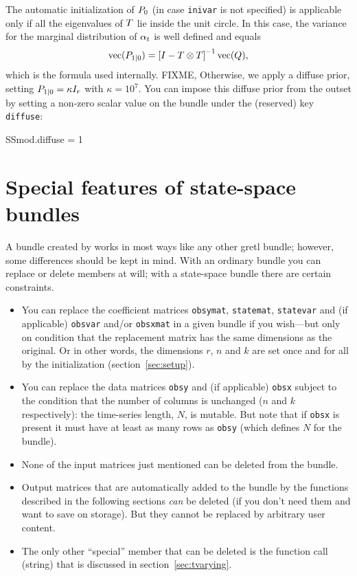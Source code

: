 The automatic initialization of $P_0$ (in case
\texttt{inivar} is not specified) is applicable only if all the
eigenvalues of $T$ lie inside the unit circle. In this case,
the variance for the marginal distribution of $\alpha_t$ is well
defined and equals
\[
\mbox{vec}(P_{1|0}) = \left[ I - T \otimes T
\right]^{-1} \mbox{vec}(Q) ,
\]
which is the formula used internally. FIXME, Otherwise, we apply a
diffuse prior, setting $P_{1|0} = \kappa I_r$ with
$\kappa = 10^7$.  You can impose this diffuse prior from the outset by
setting a non-zero scalar value on the bundle under the (reserved) key
\texttt{diffuse}:
%
\begin{code}
SSmod.diffuse = 1
\end{code}

\section{Special features of state-space bundles}
\label{sec:ss-special}

A bundle created by  works in most ways like any other
gretl bundle; however, some differences should be kept in mind.  With
an ordinary bundle you can replace or delete members at will; with a
state-space bundle there are certain constraints.

\begin{itemize}
\item You can replace the coefficient matrices \texttt{obsymat},
  \texttt{statemat}, \texttt{statevar} and (if applicable)
  \texttt{obsvar} and/or \texttt{obsxmat} in a given bundle if you
  wish---but only on condition that the replacement matrix has the
  same dimensions as the original. Or in other words, the dimensions
  $r$, $n$ and $k$ are set once and for all by the initialization
  (section~\ref{sec:setup}).
\item You can replace the data matrices \texttt{obsy} and (if
  applicable) \texttt{obsx} subject to the condition that the number
  of columns is unchanged ($n$ and $k$ respectively): the time-series
  length, $N$, is mutable. But note that if \texttt{obsx} is present
  it must have at least as many rows as \texttt{obsy} (which defines
  $N$ for the bundle).
\item None of the input matrices just mentioned can be deleted from
  the bundle.
\item Output matrices that are automatically added to the bundle by
  the functions described in the following sections \textit{can} be
  deleted (if you don't need them and want to save on storage). But
  they cannot be replaced by arbitrary user content.
\item The only other ``special'' member that can be deleted is the
  function call (string) that is discussed in
  section~\ref{sec:tvarying}.
\end{itemize}

